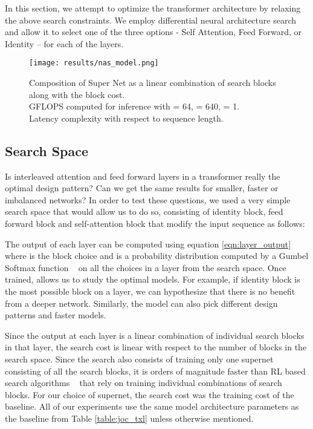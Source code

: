 \documentclass[11pt]{article}
\begin{document}
In this section, we attempt to optimize the transformer architecture by relaxing the above search constraints. We employ differential neural architecture search and allow it to select one of the three options - Self Attention, Feed Forward, or Identity -- for each of the layers.

\begin{figure}[h]
    \centering
    \texttt{[image: results/nas\_model.png]}
    \captionsetup{justification=centering}
    \caption{Composition of Super Net as a linear combination of search blocks along with the block cost.\\
    GFLOPS computed for inference with  = 64,  = 640,  = 1.  \\
    Latency complexity with respect to sequence length.}
    \label{fig:supernet}
\end{figure}  

\subsection{Search Space}

Is interleaved attention and feed forward layers in a transformer really the optimal design pattern? Can we get the same results for smaller, faster or imbalanced networks? In order to test these questions, we used a very simple search space that would allow us to do so, consisting of identity block, feed forward block and self-attention block that modify the input sequence  as follows:










The output of each layer  can be computed using equation  \ref{eqn:layer_output} where  is the block choice and  is a probability distribution computed by a Gumbel Softmax function ~\citep{gumbel_softmax1,gumbel_softmax2} on all the choices in a layer from the search space. Once trained,  allows us to study the optimal models. For example, if identity block is the most possible block on a layer, we can hypothesize that there is no benefit from a deeper network. Similarly, the model can also pick different design patterns and faster models.





Since the output at each layer is a linear combination of individual search blocks in that layer, the search cost is linear with respect to the number of blocks in the search space. Since the search also consists of training only one supernet consisting of all the search blocks, it is orders of magnitude faster than RL based search algorithms ~\citep{rl1,rl2} that rely on training individual combinations of search blocks. For our choice of supernet, the search cost was  the training cost of the baseline. All of our experiments use the same model architecture parameters as the baseline from Table \ref{table:joc_txl} unless otherwise mentioned.
\end{document}
